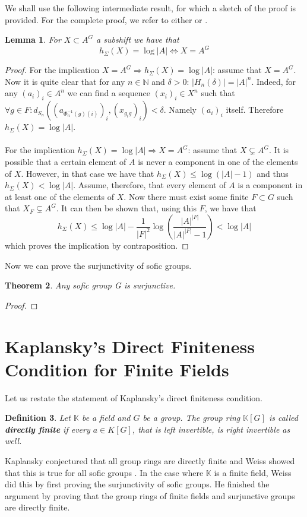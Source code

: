 \documentclass[titlepage, a4paper]{article}
\newcommand{\N}{\mathbb{N}}
\theoremstyle{theoremdd}
\newtheorem{theorem}{Theorem}[section]
\newtheorem{lemma}[theorem]{Lemma}
\theoremstyle{definitiondd}
\newtheorem{definition}[theorem]{Definition}
\theoremstyle{remarkdd}
\begin{document}
We shall use the following intermediate result, for which a sketch of the proof is provided. For the complete proof, we refer to either \cite[paragraph 2.13.7]{capraro_lupini_2015} or \cite[theorem 4.12]{kerr_li_2010}.

\begin{lemma}
For $X \subset A^G$ a subshift we have that 
		\[
		h_\Sigma(X) = \log |A| \Leftrightarrow X = A^G
		\]
\end{lemma}
\begin{proof}
For the implication $X = A^G \Rightarrow h_\Sigma(X) = \log |A|$: assume that $X = A^G$. Now it is quite clear that for any $n \in \N$ and $\delta > 0$: $|H_n(\delta)| = |A|^n$. Indeed, for any $(a_i)_i \in A^n$ we can find a sequence $(x_i)_i \in X^n$ such that $\forall g \in F: d_{S_n}((a_{\Phi^{-1}_n(g)(i)})_i,(x_{g_i g})_i) < \delta$. Namely  $(a_i)_i$ itself. Therefore $h_\Sigma(X) = \log |A|$.\\
\\
For the implication $h_\Sigma(X) = \log |A| \Rightarrow X = A^G$: assume that $X \varsubsetneq A^G$. It is possible that a certain element of $A$ is never a component in one of the elements of $X$. However, in that case we have that $h_\Sigma(X) \leq \log (|A|-1) $ and thus $h_\Sigma(X) < \log |A|$. Assume, therefore, that every element of $A$ is a component in at least one of the elements of $X$. Now there must exist some finite $F \subset G$ such that $X_F \varsubsetneq A^G$. It can then be shown that, using this $F$, we have that
		\[
		h_\Sigma(X) \leq \log |A| - \frac{1}{|F|^2} \log \left(\frac{|A|^{|F|}}{|A|^{|F|} - 1}\right) < \log |A|
		\]
which proves the implication by contraposition. 
\end{proof}

Now we can prove the surjunctivity of sofic groups.

\begin{theorem}
Any sofic group G is surjunctive.
\end{theorem}
\begin{proof}

\end{proof}

	\section{Kaplansky's Direct Finiteness Condition for Finite Fields}
	Let us restate the statement of Kaplansky's direct finiteness condition.
	\begin{definition}
		Let $\mathbb K$ be a field and $G$ be a group. The group ring $\mathbb K[G]$ is called \textbf{directly finite} if every  $a \in K[G]$, that is left invertible, is right invertible as well. 
		
	\end{definition}
	Kaplansky conjectured that all group rings are directly finite and Weiss showed that this is true for all sofic groups \cite[section 3, section 4]{weiss_2000}. 
	In the case where $\mathbb K$ is a finite field, Weiss did this by first proving the surjunctivity of sofic groups.
	He finished the argument by proving that the group rings of finite fields and surjunctive groups are directly finite.  
\end{document}
